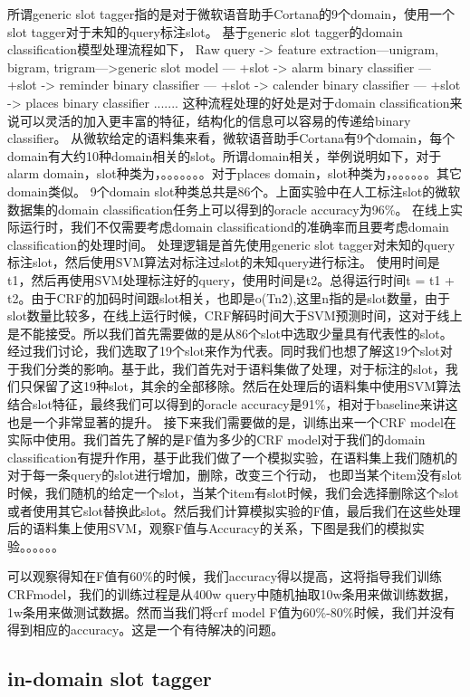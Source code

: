 \documentclass[master]{njuthesis}
\begin{document}
    所谓generic slot tagger指的是对于微软语音助手Cortana的9个domain，使用一个slot tagger对于未知的query标注slot。    
    基于generic slot tagger的domain classification模型处理流程如下，
    Raw query -> feature extraction---unigram, bigram, trigram--->generic slot model 
--- +slot -> alarm binary classifier
--- +slot -> reminder binary classifier
--- +slot -> calender binary classifier
--- +slot -> places binary classifier
.......
    这种流程处理的好处是对于domain classification来说可以灵活的加入更丰富的特征，结构化的信息可以容易的传递给binary classifier。
    从微软给定的语料集来看，微软语音助手Cortana有9个domain，每个domain有大约10种domain相关的slot。所谓domain相关，举例说明如下，对于alarm domain，slot种类为，。。。。。。。对于places domain，slot种类为，。。。。。。其它domain类似。
    9个domain slot种类总共是86个。上面实验中在人工标注slot的微软数据集的domain classification任务上可以得到的oracle accuracy为96\%。
    在线上实际运行时，我们不仅需要考虑domain classificationd的准确率而且要考虑domain classification的处理时间。
    处理逻辑是首先使用generic slot tagger对未知的query标注slot，然后使用SVM算法对标注过slot的未知query进行标注。
    使用时间是t1，然后再使用SVM处理标注好的query，使用时间是t2。总得运行时间t = t1 + t2。由于CRF的加码时间跟slot相关，也即是o(Tn\^2),这里n指的是slot数量，由于slot数量比较多，在线上运行时候，CRF解码时间大于SVM预测时间，这对于线上是不能接受。所以我们首先需要做的是从86个slot中选取少量具有代表性的slot。
经过我们讨论，我们选取了19个slot来作为代表。同时我们也想了解这19个slot对于我们分类的影响。基于此，我们首先对于语料集做了处理，对于标注的slot，我们只保留了这19种slot，其余的全部移除。然后在处理后的语料集中使用SVM算法结合slot特征，最终我们可以得到的oracle accuracy是91\%，相对于baseline来讲这也是一个非常显著的提升。
接下来我们需要做的是，训练出来一个CRF model在实际中使用。我们首先了解的是F值为多少的CRF model对于我们的domain classification有提升作用，基于此我们做了一个模拟实验，在语料集上我们随机的对于每一条query的slot进行增加，删除，改变三个行动，
也即当某个item没有slot时候，我们随机的给定一个slot，当某个item有slot时候，我们会选择删除这个slot或者使用其它slot替换此slot。然后我们计算模拟实验的F值，最后我们在这些处理后的语料集上使用SVM，观察F值与Accuracy的关系，下图是我们的模拟实验。。。。。。

可以观察得知在F值有60\%的时候，我们accuracy得以提高，这将指导我们训练CRFmodel，我们的训练过程是从400w query中随机抽取10w条用来做训练数据，1w条用来做测试数据。然而当我们将crf model F值为60\%-80\%时候，我们并没有得到相应的accuracy。这是一个有待解决的问题。

\subsection{in-domain slot tagger}
\end{document}
